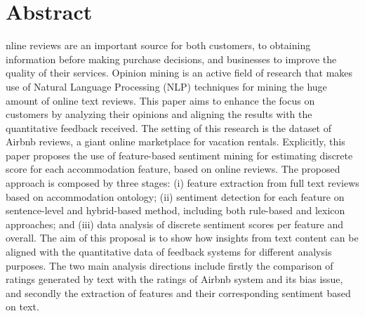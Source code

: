 %

\let\cleardoublepage\clearpage
\chapter{Abstract}
\begin{SingleSpace}

nline reviews are an important source for both customers, to obtaining information before making purchase decisions, and businesses to improve the quality of their services. Opinion mining is an active field of research that makes use of Natural Language Processing (NLP) techniques for mining the huge amount of online text reviews. This paper aims to enhance the focus on customers by analyzing their opinions and aligning the results with the quantitative feedback received. The setting of this research is the dataset of Airbnb reviews, a giant online marketplace for vacation rentals. Explicitly, this paper proposes the use of feature-based sentiment mining for estimating discrete score for each accommodation feature, based on online reviews. The proposed approach is composed by three stages: (i) feature extraction from full text reviews based on accommodation ontology; (ii) sentiment detection for each feature on sentence-level and hybrid-based method, including both rule-based and lexicon approaches; and (iii) data analysis of discrete sentiment scores per feature and overall. The aim of this proposal is to show how insights from text content can be aligned with the quantitative data of feedback systems for different analysis purposes. The two main analysis directions include firstly the comparison of ratings generated by text with the ratings of Airbnb system and its bias issue, and secondly the extraction of features and their corresponding sentiment based on text. 
\end{SingleSpace}
\clearpage